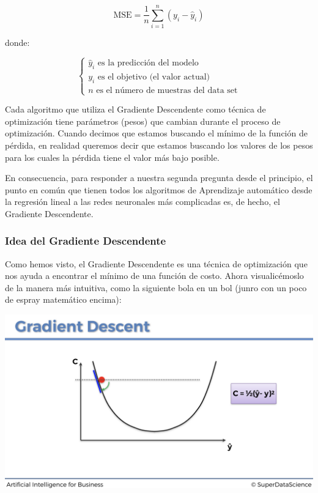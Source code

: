 \documentclass[]{book}
\begin{document}
\[\textrm{MSE} = \frac{1}{n} \sum_{i=1}^n (y_i - \hat{y}_i)\]

donde:

\[
\begin{cases}
        \textrm{$\hat{y}_i$ es la predicción del modelo} \\
        \textrm{$y_i$ es el objetivo (el valor actual)} \\
        \textrm{$n$ es el número de muestras del data set}
    \end{cases}
\]

Cada algoritmo que utiliza el Gradiente Descendente como técnica de optimización tiene parámetros (pesos) que cambian durante el proceso de optimización. Cuando decimos que estamos buscando el mínimo de la función de pérdida, en realidad queremos decir que estamos buscando los valores de los pesos para los cuales la pérdida tiene el valor más bajo posible.

En consecuencia, para responder a nuestra segunda pregunta desde el principio, el punto en común que tienen todos los algoritmos de Aprendizaje automático desde la regresión lineal a las redes neuronales más complicadas es, de hecho, el Gradiente Descendente.

\hypertarget{idea-del-gradiente-descendente}{%
\subsubsection{Idea del Gradiente Descendente}\label{idea-del-gradiente-descendente}}

Como hemos visto, el Gradiente Descendente es una técnica de optimización que nos ayuda a encontrar el mínimo de una función de costo. Ahora visualicémoslo de la manera más intuitiva, como la siguiente bola en un bol (junro con un poco de espray matemático encima):

\includegraphics{Images/ANN_20.png}
\end{document}
